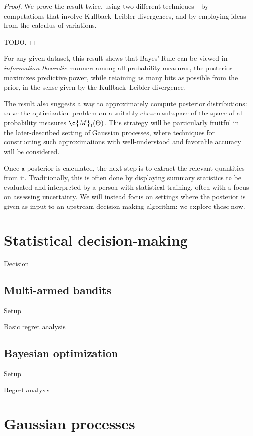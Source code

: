 \documentclass[11pt]{book}
\begin{document}
\begin{proof}
We prove the result twice, using two different techniques---by computations that involve Kullback--Leibler divergences, and by employing ideas from the calculus of variations.

TODO.
\end{proof}

For any given dataset, this result shows that  Bayes' Rule can be viewed in \emph{information-theoretic} manner: among all probability measures, the posterior maximizes predictive power, while retaining as many bits as possible from the prior, in the sense given by the Kullback--Leibler divergence.

The result also suggests a way to approximately compute posterior distributions: solve the optimization problem on a suitably chosen subspace of the space of all probability measures $\c{M}_1(\Theta)$.
This strategy will be particularly fruitful in the later-described setting of Gaussian processes, where techniques for constructing such approximations with well-understood and favorable accuracy will be considered.

Once a posterior is calculated, the next step is to extract the relevant quantities from it.
Traditionally, this is often done by displaying summary statistics to be evaluated and interpreted by a person with statistical training, often with a focus on assessing uncertainty.
We will instead focus on settings where the posterior is given as input to an upstream decision-making algorithm: we explore these now.

\section{Statistical decision-making}

Decision

\subsection{Multi-armed bandits}

Setup

Basic regret analysis

\subsection{Bayesian optimization}

Setup

Regret analysis

\section{Gaussian processes}
\end{document}
